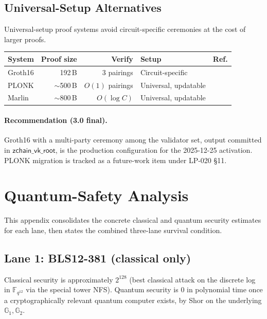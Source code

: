 \documentclass[11pt]{article}
\begin{document}
\subsection{Universal-Setup Alternatives}

Universal-setup proof systems avoid circuit-specific ceremonies at the
cost of larger proofs.

\begin{center}
\begin{tabular}{lrrll}
\toprule
\textbf{System} & \textbf{Proof size} & \textbf{Verify} &
  \textbf{Setup} & \textbf{Ref.} \\
\midrule
Groth16 & 192\,B & 3 pairings & Circuit-specific & \cite{groth2016} \\
PLONK   & $\sim$500\,B & $O(1)$ pairings & Universal, updatable
  & \cite{plonk2019} \\
Marlin  & $\sim$800\,B & $O(\log C)$ & Universal, updatable
  & \cite{marlin2020} \\
\bottomrule
\end{tabular}
\end{center}

\paragraph{Recommendation (3.0 final).}
Groth16 with a multi-party ceremony among the validator set, output
committed in $\mathsf{zchain\_vk\_root}$, is the production
configuration for the 2025-12-25 activation.  PLONK migration is
tracked as a future-work item under LP-020 \S11.

\section{Quantum-Safety Analysis}
\label{app:quantum}

This appendix consolidates the concrete classical and quantum security
estimates for each lane, then states the combined three-lane survival
condition.

\subsection{Lane 1: BLS12-381 (classical only)}

Classical security is approximately $2^{128}$ (best classical attack
on the discrete log in $\mathbb{F}_{q^{12}}$ via the special tower
NFS).  Quantum security is $0$ in polynomial time once a
cryptographically relevant quantum computer exists, by Shor on the
underlying $\mathbb{G}_1, \mathbb{G}_2$.
\end{document}
